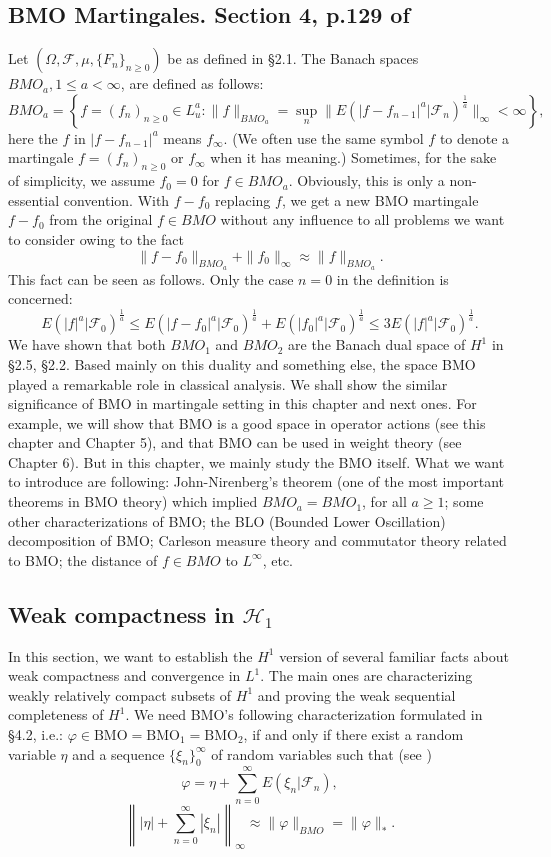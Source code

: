 \documentclass[reqno]{amsart}
\newcommand{\norm}[1]{\left\lVert#1\right\rVert}
\numberwithin{equation}{section}
\begin{document}
\subsection{BMO Martingales. Section 4, p.129 of \cite{Long}}
Let $(\Omega, \mathcal{F}, \mu, \{F_{n}\}_{n\geq 0})$ be as defined in §2.1. The Banach spaces $BMO_{a}, 1 \leq a < \infty$, are defined as follows:
\[
BMO_{a} = \left\{ f = (f_n)_{n\ge0} \in L_u^a: \|f\|_{BMO_a}=\sup_{n}\|E(|f - f_{n-1}|^a|\mathcal{F}_n)^{\frac1a}\|_{\infty} < \infty \right\},
\]
here the $f$ in $|f - f_{n-1}|^{a}$ means $f_{\infty}$. (We often use the same symbol $f$ to denote a martingale $f = (f_{n})_{n\geq 0}$ or $f_\infty$ when it has meaning.) Sometimes, for the sake of simplicity, we assume $f_{0} = 0$ for $f \in BMO_{a}$. Obviously, this is only a non-essential convention. With $f - f_{0}$ replacing $f$, we get a new BMO martingale $f - f_{0}$ from the original $f \in BMO$ without any influence to all problems we want to consider owing to the fact
\[
\|f - f_{0}\|_{BMO_{a}} + \|f_{0}\|_{\infty} \approx \|f\|_{BMO_{a}}.
\]
This fact can be seen as follows. Only the case $n = 0$ in the definition is concerned:
\[
E(|f|^a|\mathcal{F}_0)^{\frac1a} \le E(|f-f_0|^a|\mathcal{F}_0)^{\frac1a}+E(|f_0|^a|\mathcal{F}_0)^{\frac1a} \le 3 E(|f|^a|\mathcal{F}_0)^{\frac1a}.
\]
We have shown that both $BMO_{1}$ and $BMO_{2}$ are the Banach dual space of $H^{1}$ in §2.5, §2.2. Based mainly on this duality and something else, the space BMO played a remarkable role in classical analysis. We shall show the similar significance of BMO in martingale setting in this chapter and next ones. For example, we will show that BMO is a good space in operator actions (see this chapter and Chapter 5), and that BMO can be used in weight theory (see Chapter 6). But in this chapter, we mainly study the BMO itself. What we want to introduce are following: John-Nirenberg's theorem (one of the most important theorems in BMO theory) which implied $BMO_{a} = BMO_{1}$, for all $a \geq 1$; some other characterizations of BMO; the BLO (Bounded Lower Oscillation) decomposition of BMO; Carleson measure theory and commutator theory related to BMO; the distance of $f \in BMO$ to $L^{\infty}$, etc.


\subsection{Weak compactness in $\mathcal{H}_1$}
In this section, we want to establish the $H^{1}$ version of several familiar facts about weak compactness and convergence in $L^{1}$. The main ones are characterizing weakly relatively compact subsets of $H^{1}$ and proving the weak sequential completeness of $H^{1}$. We need BMO's following characterization formulated in §4.2, i.e.: $\varphi \in \text{BMO} = \text{BMO}_{1} = \text{BMO}_{2}$, if and only if there exist a random variable $\eta$ and a sequence $\{\xi_{n}\}_0^\infty$ of random variables such that (see \cite[Theorem 4.2.8]{Long})
$$\varphi=\eta +\sum_{n=0}^{\infty} E(\xi_n|\mathcal{F}_n),$$
$$\norm{|\eta|+\sum_{n=0}^{\infty}|\xi_n| }_\infty \approx \|\varphi\|_{BMO}=\|\varphi\|_*.$$
\end{document}
